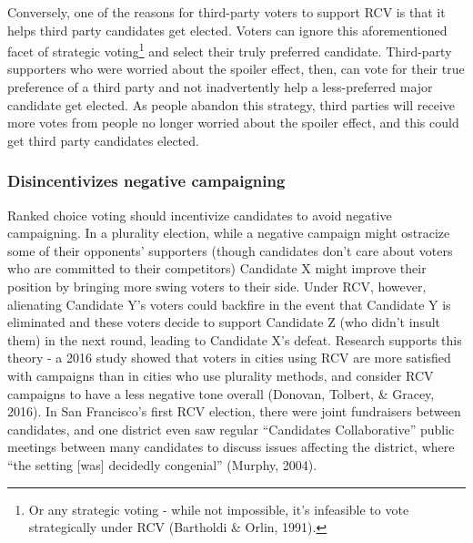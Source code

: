 \documentclass[12pt,twoside]{reedthesis}
\begin{document}
Conversely, one of the reasons for third-party voters to support RCV is that it helps third party candidates get elected. Voters can ignore this aforementioned facet of strategic voting\footnote{Or any strategic voting - while not impossible, it's infeasible to vote strategically under RCV (Bartholdi \& Orlin, 1991).} and select their truly preferred candidate. Third-party supporters who were worried about the spoiler effect, then, can vote for their true preference of a third party and not inadvertently help a less-preferred major candidate get elected. As people abandon this strategy, third parties will receive more votes from people no longer worried about the spoiler effect, and this could get third party candidates elected.

\hypertarget{disincentivizes-negative-campaigning}{%
\subsubsection{Disincentivizes negative campaigning}\label{disincentivizes-negative-campaigning}}

Ranked choice voting should incentivize candidates to avoid negative campaigning. In a plurality election, while a negative campaign might ostracize some of their opponents' supporters (though candidates don't care about voters who are committed to their competitors) Candidate X might improve their position by bringing more swing voters to their side. Under RCV, however, alienating Candidate Y's voters could backfire in the event that Candidate Y is eliminated and these voters decide to support Candidate Z (who didn't insult them) in the next round, leading to Candidate X's defeat. Research supports this theory - a 2016 study showed that voters in cities using RCV are more satisfied with campaigns than in cities who use plurality methods, and consider RCV campaigns to have a less negative tone overall (Donovan, Tolbert, \& Gracey, 2016). In San Francisco's first RCV election, there were joint fundraisers between candidates, and one district even saw regular ``Candidates Collaborative'' public meetings between many candidates to discuss issues affecting the district, where ``the setting {[}was{]} decidedly congenial'' (Murphy, 2004).
\end{document}
